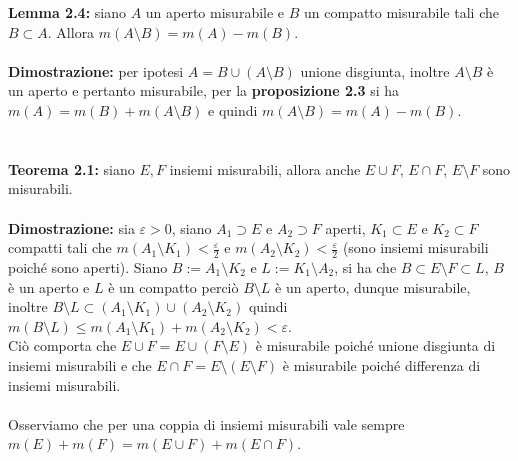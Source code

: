 \documentclass{article}
\begin{document}
\textbf{Lemma 2.4:} siano $A$ un aperto misurabile e $B$ un compatto misurabile tali che $B \subset A$. Allora $m(A \setminus B) = m(A) - m(B)$. \\ \\
\textbf{Dimostrazione:} per ipotesi $A = B \cup (A \setminus B)$ unione disgiunta, inoltre $A \setminus B$ è un aperto e pertanto misurabile, per la \textbf{proposizione 2.3} si ha $m(A) = m(B) + m(A \setminus B)$ e quindi $m(A \setminus B) = m(A) - m(B)$. \\ \\ \\
\textbf{Teorema 2.1:} siano $E, F$ insiemi misurabili, allora anche $E \cup F$, $E \cap F$, $E \setminus F$ sono misurabili. \\ \\
\textbf{Dimostrazione:} sia $\varepsilon > 0$, siano $A_1 \supset E$ e $A_2 \supset F$ aperti, $K_1 \subset E$ e $K_2 \subset F$ compatti tali che $m(A_1 \setminus K_1) < \frac{\varepsilon}{2}$ e $m(A_2 \setminus K_2) < \frac{\varepsilon}{2}$ (sono insiemi misurabili poiché sono aperti). Siano $B := A_1 \setminus K_2$ e $L := K_1 \setminus A_2$, si ha che $B \subset E \setminus F \subset L$, $B$ è un aperto e $L$ è un compatto perciò $B \setminus L$ è un aperto, dunque misurabile, inoltre $B \setminus L \subset (A_1 \setminus K_1) \cup (A_2 \setminus K_2)$ quindi $m(B \setminus L) \leq m(A_1 \setminus K_1) + m(A_2 \setminus K_2) < \varepsilon$. \\
Ciò comporta che $E \cup F = E \cup (F \setminus E)$ è misurabile poiché unione disgiunta di insiemi misurabili e che $E \cap F = E \setminus (E \setminus F)$ è misurabile poiché differenza di insiemi misurabili. \\ \\
Osserviamo che per una coppia di insiemi misurabili vale sempre $m(E) + m(F) = m(E \cup F) + m(E \cap F)$. \\ \\
\end{document}
